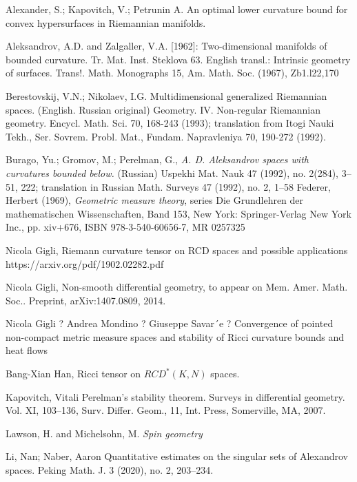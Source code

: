 \begin{thebibliography}{52}

 Alexander, S.; Kapovitch, V.; Petrunin A.
An optimal lower curvature bound for convex hypersurfaces in Riemannian manifolds.


Aleksandrov, A.D. and Zalgaller, V.A. [1962]: Two-dimensional manifolds of bounded curvature.
Tr. Mat. Inst. Steklova 63. English transl.: Intrinsic geometry of surfaces. Trans!. Math. Monographs
15, Am. Math. Soc. (1967), Zb1.l22,170


Berestovskij, V.N.; Nikolaev, I.G.
Multidimensional generalized Riemannian spaces. (English. Russian original)
Geometry. IV. Non-regular Riemannian geometry. Encycl. Math. Sci. 70, 168-243 (1993); translation from Itogi Nauki Tekh., Ser. Sovrem. Probl. Mat., Fundam. Napravleniya 70, 190-272 (1992).


 Burago, Yu.; Gromov, M.; Perelman, G., \textit{A. D. Aleksandrov spaces
with curvatures bounded below.} (Russian)  Uspekhi Mat. Nauk  47  (1992),  no.
2(284), 3--51, 222;   translation in  Russian Math. Surveys  47  (1992),  no. 2, 1--58
Federer, Herbert (1969), \textit{Geometric measure theory}, series Die Grundlehren der mathematischen Wissenschaften, Band 153, New York: Springer-Verlag New York Inc., pp. xiv+676, ISBN 978-3-540-60656-7, MR 0257325

Nicola Gigli,
Riemann curvature tensor on RCD spaces and possible applications https://arxiv.org/pdf/1902.02282.pdf

Nicola Gigli,
Non-smooth differential geometry, to appear on Mem. Amer. Math. Soc..
Preprint, arXiv:1407.0809, 2014.

Nicola Gigli ? Andrea Mondino ? Giuseppe Savar´e ?
Convergence of pointed non-compact metric measure spaces
and stability of Ricci curvature bounds and heat flows



 Bang-Xian Han, 
Ricci tensor on $RCD^*(K, N)$ spaces.

 Kapovitch, Vitali Perelman's stability theorem. Surveys in differential geometry. Vol. XI, 103–136, Surv. Differ. Geom., 11, Int. Press, Somerville, MA, 2007.

Lawson, H. and Michelsohn, M.
\textit{Spin geometry}

Li, Nan; Naber, Aaron
Quantitative estimates on the singular sets of Alexandrov spaces. 
Peking Math. J. 3 (2020), no. 2, 203--234.


\end{thebibliography}

